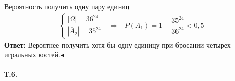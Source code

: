 \documentclass[a4paper,12pt]{article} %
\newcommand{\tb}[1]{\textbf{#1}}
\newcommand{\abs}[1]{\left|#1\right|}
\newcommand{\ol}[1]{\ensuremath{\overline{#1}}}
\begin{document}
Вероятность получить одну пару единиц
\begin{align}
	\begin{cases}
		\abs{\Omega}=36^{24}\\
		\abs{\ol{A}_2}=35^{24}
		\end{cases}~~~\Longrightarrow~~~P(A_1)=
	1-\dfrac{35^{24}}{36^{24}}<0,5
\end{align}
\tb{Ответ: }Вероятнее получить хотя бы одну единицу при
бросании четырех игральных костей.\hfill$ \blacktriangleleft $

\paragraph{Т.6.}
\end{document}
